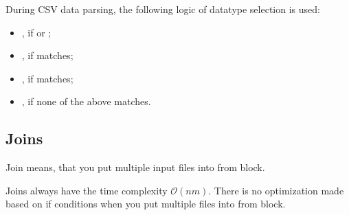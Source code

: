 During CSV data parsing, the following logic of datatype selection is used:
\begin{itemize}
    \item {}, if  or ;
    \item {}, if \icode{[0-9]+} matches;
    \item {}, if  matches;
    \item {}, if none of the above matches.
\end{itemize}

\subsection{Joins}
Join means, that you put multiple input files into from block.

Joins always have the time complexity $\mathcal{O}(nm)$. There is no optimization made based on if conditions when you put multiple files into from block.

